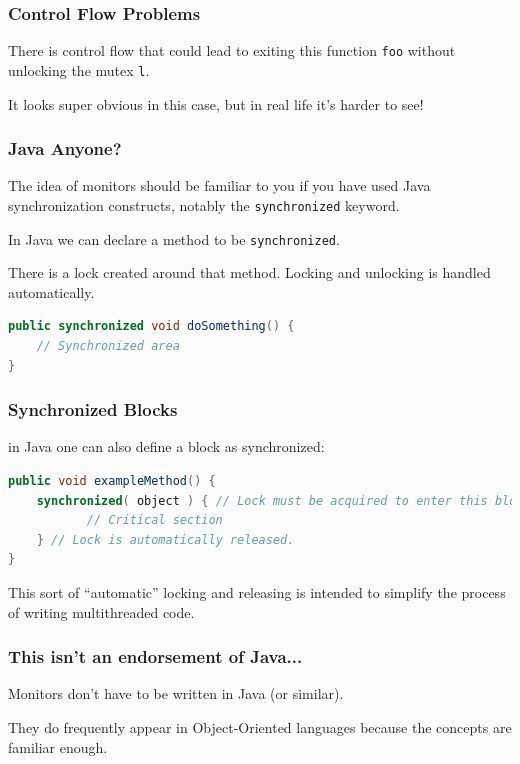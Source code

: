 \begin{frame}
	\frametitle{Control Flow Problems}

	There is control flow that could lead to exiting this function \texttt{foo} without unlocking the mutex \texttt{l}.

	It looks super obvious in this case, but in real life it's harder to see!

\end{frame}

\begin{frame}[fragile]
	\frametitle{Java Anyone?}

	The idea of monitors should be familiar to you if you have used Java synchronization constructs, notably the \texttt{synchronized} keyword.

	In Java we can declare a method to be \texttt{synchronized}.

	There is a lock created around that method. Locking and unlocking is handled automatically.

	\begin{lstlisting}[language=Java]
public synchronized void doSomething() {
    // Synchronized area
}
\end{lstlisting}

\end{frame}

\begin{frame}[fragile]
	\frametitle{Synchronized Blocks}

	in Java one can also define a block as synchronized:

	\begin{lstlisting}[language=Java]
public void exampleMethod() {
    synchronized( object ) { // Lock must be acquired to enter this block
           // Critical section 
    } // Lock is automatically released.
}
\end{lstlisting}

	This sort of ``automatic'' locking and releasing is intended to simplify the process of writing multithreaded code.

\end{frame}

\begin{frame}
	\frametitle{This isn't an endorsement of Java...}

	Monitors don't have to be written in Java (or similar).

	They do frequently appear in Object-Oriented languages because the concepts are familiar enough.


\end{frame}

